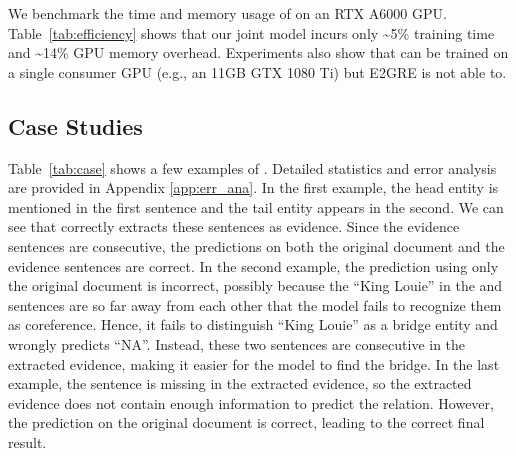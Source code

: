 \smallskip
{}
We benchmark the time and memory usage of \ours on an RTX A6000 GPU.
Table~\ref{tab:efficiency} shows that our joint model incurs only \textasciitilde5\% training time and \textasciitilde14\% GPU memory overhead.
Experiments also show that \ours can be trained on a single consumer GPU (e.g., an 11GB GTX 1080 Ti) but E2GRE is not able to.


\subsection{Case Studies}

Table~\ref{tab:case} shows a few examples of \ours. 
Detailed statistics and error analysis are provided in Appendix \ref{app:err_ana}.
In the first example, the head entity is mentioned in the first sentence and the tail entity appears in the second. 
We can see that \ours correctly extracts these sentences as evidence. 
Since the evidence sentences are consecutive, the predictions on both the original document and the evidence sentences are correct. 
In the second example, 
the prediction using only the original document is incorrect, possibly because the ``King Louie'' in the  and  sentences are so far away from each other that the model fails to recognize them as coreference. Hence, it fails to distinguish ``King Louie'' as a bridge entity and wrongly predicts ``NA''.
Instead, these two sentences are consecutive in the extracted evidence, making it easier for the model to find the bridge. 
In the last example, the  sentence is missing in the extracted evidence, 
so the extracted evidence does not contain enough information to predict the relation. However, the prediction on the original document is correct, leading to the correct final result.





